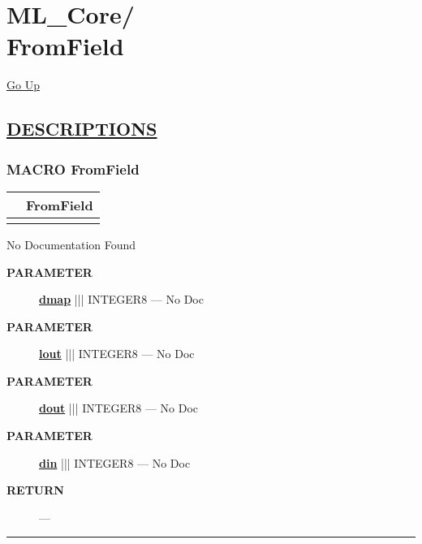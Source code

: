 \chapter*{\color{headfile}
{\large ML\_Core\slash\hspace{0pt}}
 \\
FromField
}
\hypertarget{ecldoc:toc:ML_Core.FromField}{}
\hyperlink{ecldoc:toc:root/ML_Core}{Go Up}


\section*{\underline{\textsf{DESCRIPTIONS}}}
\subsection*{\textsf{\colorbox{headtoc}{\color{white} MACRO}
FromField}}

\hypertarget{ecldoc:ml_core.fromfield}{}

{\renewcommand{\arraystretch}{1.5}
\begin{tabularx}{\textwidth}{|>{\raggedright\arraybackslash}l|X|}
\hline
\hspace{0pt}\mytexttt{\color{red} } & \textbf{FromField} \\
\hline
\multicolumn{2}{|>{\raggedright\arraybackslash}X|}{\hspace{0pt}\mytexttt{\color{param} (dIn,lOut,dOut,dMap='')}} \\
\hline
\end{tabularx}
}

\par





No Documentation Found






\par
\begin{description}
\item [\colorbox{tagtype}{\color{white} \textbf{\textsf{PARAMETER}}}] \textbf{\underline{dmap}} ||| INTEGER8 --- No Doc
\item [\colorbox{tagtype}{\color{white} \textbf{\textsf{PARAMETER}}}] \textbf{\underline{lout}} ||| INTEGER8 --- No Doc
\item [\colorbox{tagtype}{\color{white} \textbf{\textsf{PARAMETER}}}] \textbf{\underline{dout}} ||| INTEGER8 --- No Doc
\item [\colorbox{tagtype}{\color{white} \textbf{\textsf{PARAMETER}}}] \textbf{\underline{din}} ||| INTEGER8 --- No Doc
\end{description}







\par
\begin{description}
\item [\colorbox{tagtype}{\color{white} \textbf{\textsf{RETURN}}}] \textbf{} --- 
\end{description}




\rule{\linewidth}{0.5pt}
